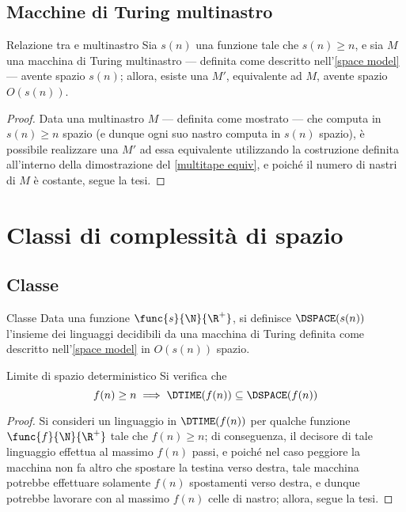 \documentclass[a4paper, 12pt]{report}
\begin{document}
    \subsection{Macchine di Turing multinastro}
    
    \begin{framedthm}[label={multitape tm space equiv}]{Relazione tra \TM e \TM multinastro}
        Sia $s(n)$ una funzione tale che $s(n) \ge n$, e sia $M$ una macchina di Turing multinastro --- definita come descritto nell'\cref{space model} --- avente spazio $s(n)$; allora, esiste una \TM $M'$, equivalente ad $M$, avente spazio $O(s(n))$.
    \end{framedthm}

    \begin{proof}
        Data una \TM multinastro $M$ --- definita come mostrato --- che computa in $s(n) \ge n$ spazio (e dunque ogni suo nastro computa in $s(n)$ spazio), è possibile realizzare una \TM $M'$ ad essa equivalente utilizzando la costruzione definita all'interno della dimostrazione del \cref{multitape equiv}, e poiché il numero di nastri di $M$ è costante, segue la tesi.
    \end{proof}

    \section{Classi di complessità di spazio}

    \subsection{Classe \DSPACE}

    \begin{frameddefn}{Classe \DSPACE}
        Data una funzione $\func{s}{\N}{\R^+}$, si definisce  $\DSPACE(s(n))$ l'insieme dei linguaggi decidibili da una macchina di Turing definita come descritto nell'\cref{space model} in $O(s(n))$ spazio.
    \end{frameddefn}

    \begin{framedthm}[label={dtime in dspace}]{Limite di spazio deterministico}
        Si verifica che $$f(n) \ge n \implies \DTIME(f(n)) \subseteq \DSPACE(f(n))$$
    \end{framedthm}

    \begin{proof}
        Si consideri un linguaggio in $\DTIME(f(n))$ per qualche funzione $\func{f}{\N}{\R^+}$ tale che $f(n) \ge n$; di conseguenza, il decisore di tale linguaggio effettua al massimo $f(n)$ passi, e poiché nel caso peggiore la macchina non fa altro che spostare la testina verso destra, tale macchina potrebbe effettuare solamente $f(n)$ spostamenti verso destra, e dunque potrebbe lavorare con al massimo $f(n)$ celle di nastro; allora, segue la tesi.
    \end{proof}
\end{document}
